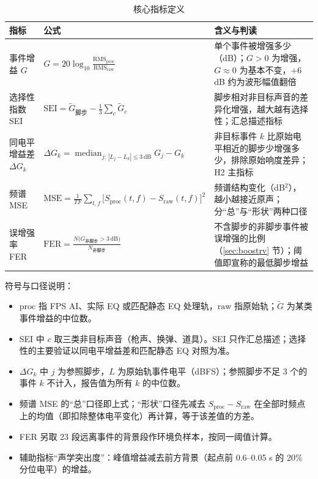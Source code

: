 \documentclass[11pt,a4paper]{ctexart}
\renewcommand{\arraystretch}{1.18}
\begin{document}
\begin{table}[htbp]\centering\small
\caption{核心指标定义}\label{tab:metrics}
\renewcommand{\arraystretch}{1.5}
\begin{tabularx}{\linewidth}{>{\raggedright\arraybackslash}p{2.3cm}>{\centering\arraybackslash}p{6.4cm}X}
\toprule
指标 & 公式 & 含义与判读 \\
\midrule
事件增益 $G$ & $\displaystyle G=20\log_{10}\frac{\mathrm{RMS}_{\mathrm{proc}}}{\mathrm{RMS}_{\mathrm{raw}}}$ &
单个事件被增强多少（dB）；$G>0$ 为增强，$G\approx 0$ 为基本不变，$+6$ dB 约为波形幅值翻倍 \\
选择性指数 SEI & $\displaystyle \mathrm{SEI}=\tilde G_{\text{脚步}}-\frac{1}{3}\sum_{c}\tilde G_{c}$ &
脚步相对非目标声音的差异化增强，越大越有选择性；汇总描述指标 \\
同电平增益差 $\Delta G_k$ & $\displaystyle \Delta G_k=\operatorname*{median}_{j:\,|L_j-L_k|\le 3\,\mathrm{dB}} G_j-G_k$ &
非目标事件 $k$ 比原始电平相近的脚步少增强多少，排除原始响度差异；H2 主指标 \\
频谱 MSE & $\displaystyle \mathrm{MSE}=\frac{1}{TF}\sum_{t,f}\bigl[S_{\mathrm{proc}}(t,f)-S_{\mathrm{raw}}(t,f)\bigr]^2$ &
频谱结构变化（dB$^2$），越小越接近原声；分“总”与“形状”两种口径 \\
误增强率 FER & $\displaystyle \mathrm{FER}=\frac{N\bigl(G_{\text{非脚步}}>3\,\mathrm{dB}\bigr)}{N_{\text{非脚步}}}$ &
不含脚步的非脚步事件被误增强的比例（\ref{sec:boostrv} 节）；阈值即宣称的最低脚步增益 \\
\bottomrule
\end{tabularx}
\end{table}

符号与口径说明：
\begin{itemize}
\item $\mathrm{proc}$ 指 FPS AI、实际 EQ 或匹配静态 EQ 处理轨，$\mathrm{raw}$ 指原始轨；$\tilde G$ 为某类事件增益的中位数。
\item SEI 中 $c$ 取三类非目标声音（枪声、换弹、道具）。SEI 只作汇总描述；选择性的主要验证以同电平增益差和匹配静态 EQ 对照为准。
\item $\Delta G_k$ 中 $j$ 为参照脚步，$L$ 为原始轨事件电平（dBFS）；参照脚步不足 3 个的事件 $k$ 不计入，报告值为所有 $k$ 的中位数。
\item 频谱 MSE 的“总”口径即上式；“形状”口径先减去 $S_{\mathrm{proc}}-S_{\mathrm{raw}}$ 在全部时频点上的均值（即扣除整体电平变化）再计算，等于该差值的方差。
\item FER 另取 23 段远离事件的背景段作环境负样本，按同一阈值计算。
\item 辅助指标“声学突出度”：峰值增益减去前方背景（起点前 0.6--0.05 s 的 20\% 分位电平）的增益。
\end{itemize}
\end{document}
